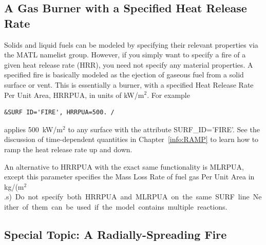 \documentclass[11pt]{book}
\begin{document}
\subsection{A Gas Burner with a Specified Heat Release Rate}

\label{info:gas_burner}

Solids and liquid fuels can be modeled by specifying their relevant
properties via the {\ct MATL} namelist group. However, if you simply
want to specify a fire of a given heat release rate (HRR),
you need not specify any material properties. A specified fire is
basically modeled as the ejection of gaseous fuel
from a solid surface or vent. This is essentially a burner, with a
specified Heat Release Rate Per Unit Area, {\ct HRRPUA}, in units of
kW/m$^2$. For example
\begin{lstlisting}
&SURF ID='FIRE', HRRPUA=500. /
\end{lstlisting}
applies 500~kW/m$^2$ to any surface with the attribute
{\ct SURF\_ID='FIRE'}. See the discussion of time-dependent quantities
in Chapter~\ref{info:RAMP} to learn how to ramp the heat release rate up and down.

An alternative to {\ct HRRPUA} with the exact same functionality is {\ct MLRPUA}, except this parameter
specifies the Mass Loss Rate of fuel gas Per Unit Area in \si{kg/(m$^2$.s)}. Do not specify both
{\ct HRRPUA} and {\ct MLRPUA} on the same {\ct SURF} line.  Neither of them can be used if the model contains multiple reactions.







\subsection{Special Topic: A Radially-Spreading Fire}
\label{info:spread}
\end{document}
